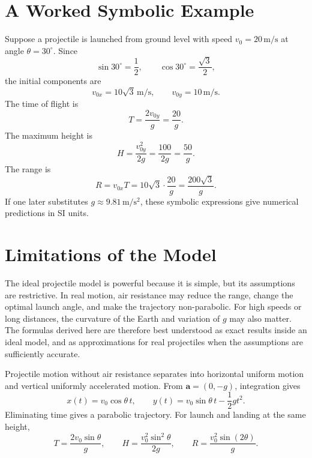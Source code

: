 \section{A Worked Symbolic Example}

Suppose a projectile is launched from ground level with speed \(v_0=20\,\mathrm{m/s}\)
at angle \(\theta=30^\circ\). Since
\[
\sin 30^\circ=\frac{1}{2},
\qquad
\cos 30^\circ=\frac{\sqrt{3}}{2},
\]
the initial components are
\[
v_{0x}=10\sqrt{3}\,\mathrm{m/s},
\qquad
v_{0y}=10\,\mathrm{m/s}.
\]
The time of flight is
\[
T=\frac{2v_{0y}}{g}=\frac{20}{g}.
\]
The maximum height is
\[
H=\frac{v_{0y}^2}{2g}=\frac{100}{2g}=\frac{50}{g}.
\]
The range is
\[
R=v_{0x}T=10\sqrt{3}\cdot\frac{20}{g}=\frac{200\sqrt{3}}{g}.
\]
If one later substitutes \(g\approx 9.81\,\mathrm{m/s^2}\), these symbolic
expressions give numerical predictions in SI units.

\section{Limitations of the Model}

The ideal projectile model is powerful because it is simple, but its assumptions
are restrictive. In real motion, air resistance may reduce the range, change the
optimal launch angle, and make the trajectory non-parabolic. For high speeds or
long distances, the curvature of the Earth and variation of \(g\) may also
matter. The formulas derived here are therefore best understood as exact results
inside an ideal model, and as approximations for real projectiles when the
assumptions are sufficiently accurate.

\begin{summarybox}
Projectile motion without air resistance separates into horizontal uniform
motion and vertical uniformly accelerated motion. From
\(\mathbf{a}=(0,-g)\), integration gives
\[
x(t)=v_0\cos\theta\,t,
\qquad
y(t)=v_0\sin\theta\,t-\frac{1}{2}gt^2.
\]
Eliminating time gives a parabolic trajectory. For launch and landing at the
same height,
\[
T=\frac{2v_0\sin\theta}{g},
\qquad
H=\frac{v_0^2\sin^2\theta}{2g},
\qquad
R=\frac{v_0^2\sin(2\theta)}{g}.
\]
\end{summarybox}
